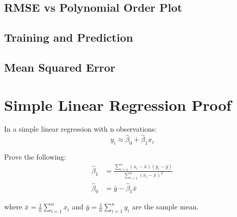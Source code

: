 \documentclass[12pt]{article}
\begin{document}
\subsection{RMSE vs Polynomial Order Plot}

\subsection{Training and Prediction}

\subsection{Mean Squared Error}

\section{Simple Linear Regression Proof}

In a simple linear regression with n observations:
\begin{equation}
    y_i \approx \hat{\beta}_0 + \hat{\beta}_1 x_i
\end{equation}

Prove the following:
\begin{align}
    \hat{\beta}_1 &= \frac{\sum_{i=1}^{n} (x_i - \bar{x}) (y_i - \bar{y})}{\sum_{i=1}^{n} (x_i - \bar{x})^2} \\
    \hat{\beta}_0 &= \bar{y} - \hat{\beta}_1 \bar{x}
\end{align}

where $\bar{x} = \frac{1}{n} \sum_{i=1}^{n}x_i$ and $\bar{y} = \frac{1}{n}\sum_{i=1}^{n}y_i$ are the sample mean.
\end{document}
